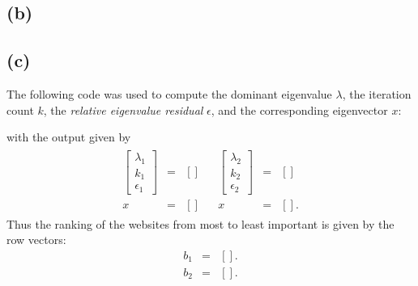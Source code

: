 \documentclass[11pt]{article}
\theoremstyle{definition}
\theoremstyle{remark}
\newcommand{\newpart}{\vspace{-0.5\baselineskip}\hrulefill\vspace{-1.3\baselineskip}}
\theoremstyle{plain}
\begin{document}
\subsection*{(b)}


\newpage
\newpart
\subsection*{(c)}
The following code was used to compute the dominant eigenvalue $\lambda$, the iteration count $k$, the \textit{relative eigenvalue residual} $\epsilon$, and the corresponding eigenvector $x$:

with the output given by
\begin{eqnarray*}
  \begin{array}{rclcrcl}
    \left[\begin{array}{c}
            \lambda_1\\
            k_1\\
            \epsilon_1
          \end{array}
    \right]
 &=&\left[\right]&&\left[\begin{array}{c}
                                             \lambda_2\\
                                             k_2\\
                                             \epsilon_2
                                           \end{array}
    \right]&=&\left[\right]\\
    x&=&\left[\right]&&x&=&\left[\right].
  \end{array}
\end{eqnarray*}
Thus the ranking of the websites from most to least important is given by the row vectors:
\begin{eqnarray*}
  b_1&=&\left[\right].\\
  b_2&=&\left[\right].
\end{eqnarray*}

\newpage
\newpart
\end{document}

